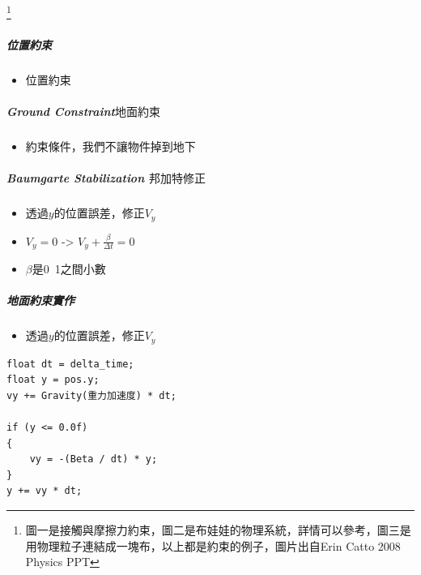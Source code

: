 \footnote{圖一是接觸與摩擦力約束，圖二是布娃娃的物理系統，詳情可以參考，圖三是用物理粒子連結成一塊布，以上都是約束的例子，圖片出自Erin Catto 2008 Physics PPT}

\subparagraph{位置約束}
\begin{itemize}
    \item{位置約束}
\end{itemize}

\subparagraph{Ground Constraint\(地面約束\)}
\begin{itemize}
    \item{約束條件，我們不讓物件掉到地下}
\end{itemize}

\subparagraph{Baumgarte Stabilization \(邦加特修正\)}

\begin{itemize}
    \item{透過$y$的位置誤差，修正$V_y$}
    \item{$V_y = 0$ -> $V_y + \frac{\beta}{\Delta t} = 0$}
    \item{$\beta$是0~1之間小數}
\end{itemize}

\subparagraph{地面約束實作}

\begin{itemize}
    \item{透過$y$的位置誤差，修正$V_y$}
\end{itemize}

\begin{lstlisting}
float dt = delta_time;
float y = pos.y;
vy += Gravity(重力加速度) * dt;

if (y <= 0.0f)
{
    vy = -(Beta / dt) * y;
}
y += vy * dt;
\end{lstlisting}


